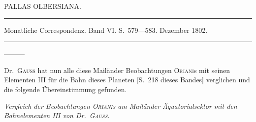 \bigskip{}
\begin{center}
PALLAS OLBERSIANA.\par
\medskip\hrule\medskip
Monatliche Correspondenz. Band VI. S.\ 579—583. Dezember 1802.\par
\medskip\hrule
\end{center}\medskip
—\quad —\quad —

Dr.\ \textsc{Gauß} hat nun alle diese Mailänder Beobachtungen \textsc{Oriani}s mit seinen Elementen III für die Bahn dieses Planeten [S.\ 218 dieses Bandes] verglichen und die folgende Übereinstimmung gefunden.
\begin{center}\textit{Vergleich der Beobachtungen \textsc{Oriani}s am Mailänder Äquatorialsektor mit den Bahnelementen III von Dr.\ \textsc{Gauß}.}\end{center}
